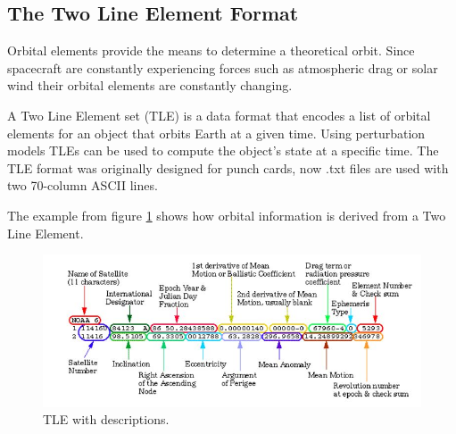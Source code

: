 \documentclass[12pt]{article}
\begin{document}
	
	
	
	\subsection{The Two Line Element Format}
	
	Orbital elements provide the means to determine a theoretical orbit. Since spacecraft are constantly experiencing forces such as atmospheric drag or solar wind their orbital elements are constantly changing. \par 
	A Two Line Element set (TLE) is a data format that encodes a list of orbital elements for an object that orbits Earth at a given time. Using perturbation models TLEs can be used to compute the object's state at a specific time. The TLE format was originally designed for punch cards, now .txt files are used with two 70-column ASCII lines.  \par 
	
	The example from figure \ref{fig:tlenasa} shows how orbital information is derived from a Two Line Element.
	\begin{figure}[H]
		\centering
		\includegraphics[width=0.7\linewidth]{tle_nasa}
		\caption{TLE with descriptions\cite{NASATLE}.}
		\label{fig:tlenasa}
	\end{figure}
	
\end{document}
